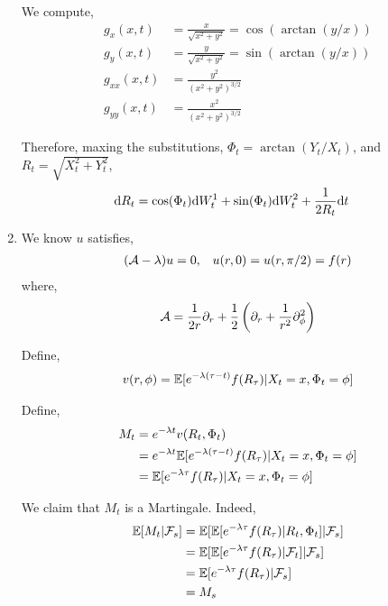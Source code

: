 \begin{solution}[Solution]
\begin{enumerate}[label=(\alph*)]
        We compute,
        \begin{align*}
            g_x(x,t) &= \frac{x}{\sqrt{x^2+y^2}} = \cos(\arctan(y/x)) \\
            g_y(x,t) &= \frac{y}{\sqrt{x^2+y^2}} = \sin(\arctan(y/x)) \\
            g_{xx}(x,t) &= \frac{y^2}{(x^2+y^2)^{3/2}} \\
            g_{yy}(x,t) &= \frac{x^2}{(x^2+y^2)^{3/2}}
        \end{align*}
        
        Therefore, maxing the substitutions, \( \Phi_t = \arctan(Y_t/X_t) \), and \( R_t = \sqrt{X_t^2+Y_t^2}  \),
        \begin{align*}
            \mathrm{d} R_t &= \cos(\Phi_t)\mathrm{d} W_t^1 + \sin(\Phi_t) \mathrm{d} W_t^2 + \frac{1}{2R_t} \mathrm{d} t
        \end{align*}


    \item
        We know \( u \) satisfies,
        \begin{align*}
            (\mathcal{A} - \lambda) u = 0, && u(r,0) = u(r,\pi/2) = f(r)
        \end{align*}
        where,
        \begin{align*}
            \mathcal{A} = \frac{1}{2r} \partial_r + \frac{1}{2}\left(\partial_r + \frac{1}{r^2}\partial_\phi^2 \right)
        \end{align*}
        

        \iffalse
        Define,
        \begin{align*}
            v(r,\phi) = \mathbb{E}[e^{-\lambda(\tau - t)}f(R_\tau) | X_t=x, \Phi_t =\phi]
        \end{align*}
        
        Define,
        \begin{align*}
            M_t &= e^{-\lambda t} v(R_t,\Phi_t)
            \\&= e^{-\lambda t} \mathbb{E}[e^{-\lambda (\tau - t)}f(R_\tau) | X_t = x, \Phi_t = \phi]
            \\&= \mathbb{E}[e^{-\lambda \tau}f(R_\tau) | X_t = x, \Phi_t = \phi]
        \end{align*}
        

        We claim that \( M_t \) is a Martingale. Indeed,
        \begin{align*}
            \mathbb{E}[ M_t | \mathcal{F}_s] 
            &= \mathbb{E}[\mathbb{E}[ e^{-\lambda \tau} f(R_\tau) | R_t,\Phi_t] | \mathcal{F}_s]
            \\&= \mathbb{E}[\mathbb{E}[ e^{-\lambda \tau} f(R_\tau) | \mathcal{F}_t] | \mathcal{F}_s]
            \\&= \mathbb{E}[ e^{-\lambda \tau} f(R_\tau) | \mathcal{F}_s]
            \\&= M_s
        \end{align*}
        

\end{enumerate}
\end{solution}
